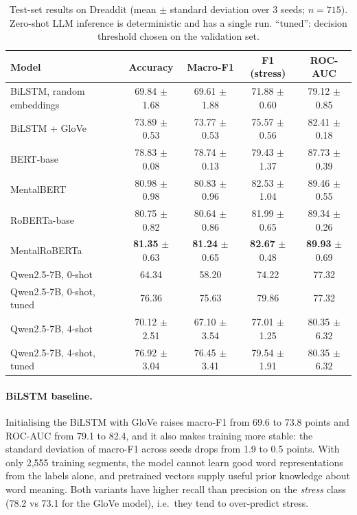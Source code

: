 \begin{table}
  \caption{Test-set results on Dreaddit (mean $\pm$ standard deviation over 3 seeds; $n = 715$).
  Zero-shot LLM inference is deterministic and has a single run. ``tuned'': decision threshold
  chosen on the validation set.}
  \label{tab:main}
  \begin{minipage}{\textwidth}
  \begin{tabular}{lcccc}
  \hline\hline
  Model & Accuracy & Macro-F1 & F1 (stress) & ROC-AUC\\
  \hline
  BiLSTM, random embeddings  & 69.84 $\pm$ 1.68 & 69.61 $\pm$ 1.88 & 71.88 $\pm$ 0.60 & 79.12 $\pm$ 0.85\\
  BiLSTM + GloVe             & 73.89 $\pm$ 0.53 & 73.77 $\pm$ 0.53 & 75.57 $\pm$ 0.56 & 82.41 $\pm$ 0.18\\
  \hline
  BERT-base                  & 78.83 $\pm$ 0.08 & 78.74 $\pm$ 0.13 & 79.43 $\pm$ 1.37 & 87.73 $\pm$ 0.39\\
  MentalBERT                 & 80.98 $\pm$ 0.98 & 80.83 $\pm$ 0.96 & 82.53 $\pm$ 1.04 & 89.46 $\pm$ 0.55\\
  RoBERTa-base               & 80.75 $\pm$ 0.82 & 80.64 $\pm$ 0.86 & 81.99 $\pm$ 0.65 & 89.34 $\pm$ 0.26\\
  MentalRoBERTa              & \textbf{81.35} $\pm$ 0.63 & \textbf{81.24} $\pm$ 0.65 & \textbf{82.67} $\pm$ 0.48 & \textbf{89.93} $\pm$ 0.69\\
  \hline
  Qwen2.5-7B, 0-shot         & 64.34            & 58.20            & 74.22            & 77.32\\
  Qwen2.5-7B, 0-shot, tuned  & 76.36            & 75.63            & 79.86            & 77.32\\
  Qwen2.5-7B, 4-shot         & 70.12 $\pm$ 2.51 & 67.10 $\pm$ 3.54 & 77.01 $\pm$ 1.25 & 80.35 $\pm$ 6.32\\
  Qwen2.5-7B, 4-shot, tuned  & 76.92 $\pm$ 3.04 & 76.45 $\pm$ 3.41 & 79.54 $\pm$ 1.91 & 80.35 $\pm$ 6.32\\
  \hline\hline
  \end{tabular}
  \end{minipage}
\end{table}

\paragraph{BiLSTM baseline.} Initialising the BiLSTM with GloVe raises macro-F1 from 69.6 to 73.8
points and ROC-AUC from 79.1 to 82.4, and it also makes training more stable: the standard deviation
of macro-F1 across seeds drops from 1.9 to 0.5 points. With only 2,555 training segments, the model
cannot learn good word representations from the labels alone, and pretrained vectors supply useful
prior knowledge about word meaning. Both variants have higher recall than precision on the
\emph{stress} class (78.2 vs 73.1 for the GloVe model), i.e.\ they tend to over-predict stress.

